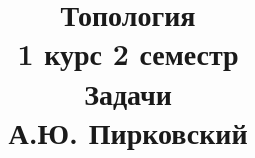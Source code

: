 \documentclass[fleqn]{article}
\title{Топология \\ 1 курс 2 семестр \\ Задачи \\  А.Ю. Пирковский}
\date{}
\begin{document}
	\maketitle
	\pagebreak	
	\tableofcontents
			
	
		
		
	
\end{document}
